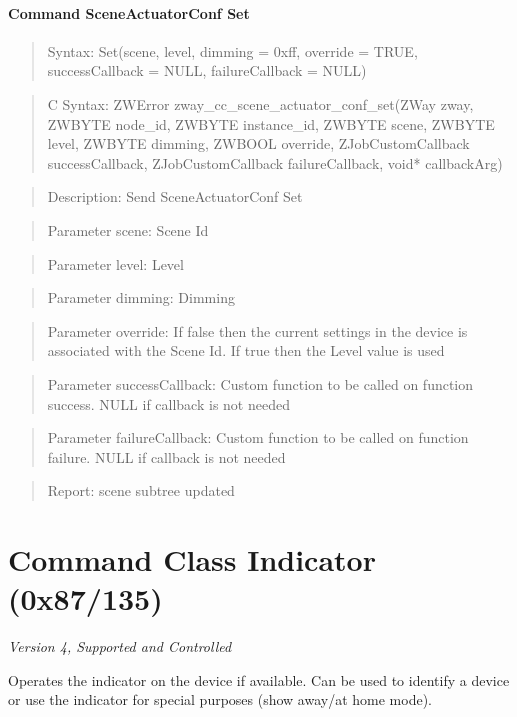 \paragraph{Command SceneActuatorConf Set}
\begin{quote}Syntax: Set(scene, level, dimming = 0xff, override = TRUE, successCallback = NULL, failureCallback = NULL)\end{quote}
\begin{quote}C Syntax: ZWError zway\_cc\_scene\_actuator\_conf\_set(ZWay zway, ZWBYTE node\_id, ZWBYTE instance\_id, ZWBYTE scene, ZWBYTE level, ZWBYTE dimming, ZWBOOL override, ZJobCustomCallback successCallback, ZJobCustomCallback failureCallback, void* callbackArg)\end{quote}
\begin{quote}Description: Send SceneActuatorConf Set\end{quote}
\begin{quote}Parameter scene: Scene Id\end{quote}
\begin{quote}Parameter level: Level\end{quote}
\begin{quote}Parameter dimming: Dimming\end{quote}
\begin{quote}Parameter override: If false then the current settings in the device is associated with the Scene Id. If true then the Level value is used\end{quote}
\begin{quote}Parameter successCallback: Custom function to be called on function success. NULL if callback is not needed\end{quote}
\begin{quote}Parameter failureCallback: Custom function to be called on function failure. NULL if callback is not needed\end{quote}
\begin{quote}Report: scene subtree updated\end{quote}


\section{Command Class Indicator (0x87/135)}

\textit{Version 4, Supported and Controlled}
\newline

Operates the indicator on the device if available. Can be used to identify a device or use the indicator for special purposes (show away/at home mode).
\newline

